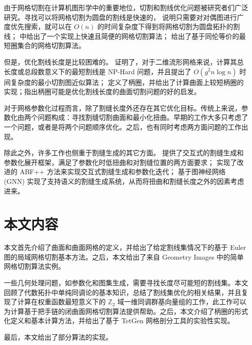 由于网格切割在计算机图形学中的重要地位，切割和割线优化问题被研究者们广泛研究。寻找可以将网格切割为圆盘的割线是快速的，\citet{Dey1995} 说明只需要对对偶图进行广度优先搜索，就可以在 $ O(n) $ 的时间复杂度下得到将网格切割为圆盘拓扑的割线；\citet{Gu2002} 中给出了一个实现上快速且简便的网格切割算法；\citet{DeVerdiere2005} 给出了基于同伦等价的最短圈集合的网格切割算法。

但是，优化割线长度是比较困难的。\citet{Erickson2002} 证明了，对于二维流形网格来说，计算其总长度或总段数意义下的最短割线是 NP-Hard 问题，并且提出了 $ O(g^2 n \log n) $ 时间复杂度的最小切割图近似算法；\citet{oncomputinghantun} 定义了柄圈，并给出了计算曲面上较短柄圈的实现\cite{Dey2013}\cite{Dey2008}；\citet{Chai2018}指出柄圈可能是优化割线长度的曲面切割问题的好的启发。

对于网格参数化过程而言，除了割缝长度外还存在其它优化目标。传统上来说，参数化由两个问题构成：寻找割缝切割曲面\cite{qdmeshseg}\cite{KhodakovskyLS03}和最小化扭曲\cite{Desbrun2002}\cite{KhodakovskyLS03}。早期的工作大多只考虑了一个问题，或者是将两个问题顺序优化。之后，也有同时考虑两方面问题的工作出现\cite{Li2018}。

除此之外，许多工作也侧重于割缝生成的其它方面。\citet{Poranne2017} 提供了交互式的割缝生成和参数化展开框架，满足了参数化时低扭曲和对割缝位置的两方面要求；\citet{wysiwyg} 实现了改进的 ABF++ 方法来实现交互式割缝生成和参数化迭代；\citet{teimury2020graphseam} 基于图神经网络 (GNN) 实现了支持语义的割缝生成系统，从而将扭曲和割缝长度之外的因素考虑进来。

\section{本文内容}

本文首先介绍了曲面和曲面网格的定义，并给出了给定割线集情况下的基于 Euler 图的局域网格切割基本方法。之后，本文给出了来自 Geometry Images 中的简单网格切割算法实例。
  
一些几何处理问题，如参数化和图集生成，需要寻找长度尽可能短的割线集。本文回顾了代数拓扑中单纯同调论的基本知识，总结了割线集优化的相关结果，并且复现了计算在权重函数最短意义下的 $ \mathbb{Z}_2 $ 域一维同调群基向量组的工作，此工作可以为计算基于把手链的闭曲面网格切割算法提供帮助。之后，本文介绍了柄圈的形式化定义和基本计算方法，并给出了基于 TetGen 网格剖分工具的实验性实现。

最后，本文给出了部分算法的实现。


